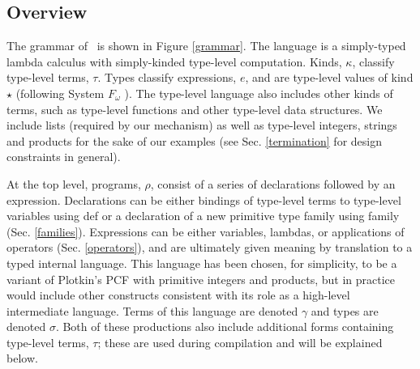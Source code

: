 \documentclass{llncs}
\begin{document}
\subsection{Overview}
The grammar of \atlam~is shown in Figure \ref{grammar}. The language is a simply-typed lambda calculus with simply-kinded type-level computation. Kinds, $\kappa$, classify type-level terms, $\tau$. 
Types classify expressions, $e$, and are type-level values of kind $\star$ (following System $F_{\omega}$ \cite{fomega}). The type-level language also includes other kinds of terms, such as type-level functions and other type-level data structures. We include lists (required by our mechanism) as well as type-level integers, strings and products for the sake of our examples (see Sec. \ref{termination} for design constraints in general).

At the top level, programs, $\rho$, consist of a series of declarations followed by an expression. Declarations can be either bindings of type-level terms to type-level variables using \textsf{def} or a declaration of a new primitive type family using \textsf{family} (Sec. \ref{families}). Expressions can be either variables, lambdas, or applications of operators (Sec. \ref{operators}), and are ultimately given meaning by translation to a typed internal language. This language has been chosen, for simplicity, to be a variant of Plotkin's PCF with primitive integers and products, but in practice would include other constructs consistent with its role as a high-level intermediate language. Terms of this language are denoted $\gamma$ and types are denoted $\sigma$. Both of these productions also include additional forms containing type-level terms, $\tau$; these are used during compilation and will be explained below.
\end{document}
